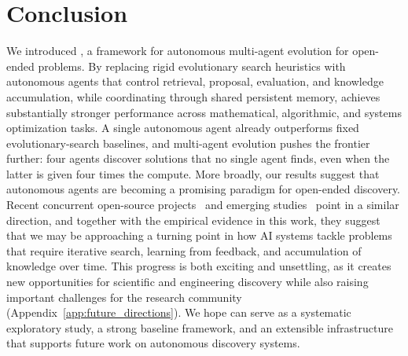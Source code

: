 
\section{Conclusion}

We introduced \method{}, a framework for autonomous multi-agent evolution for open-ended problems. By replacing rigid evolutionary search heuristics with autonomous agents that control retrieval, proposal, evaluation, and knowledge accumulation, while coordinating through shared persistent memory, \method{} achieves substantially stronger performance across mathematical, algorithmic, and systems optimization tasks. A single autonomous agent already outperforms fixed evolutionary-search baselines, and multi-agent evolution pushes the frontier further: four agents discover solutions that no single agent finds, even when the latter is given four times the compute. More broadly, our results suggest that autonomous agents are becoming a promising paradigm for open-ended discovery. Recent concurrent open-source projects~\citep{karpathy2026autoresearch,liu2026autoevolver,rllmorg2026hive} and emerging studies~\citep{chen2026avoagenticvariationoperators} point in a similar direction, and together with the empirical evidence in this work, they suggest that we may be approaching a turning point in how AI systems tackle problems that require iterative search, learning from feedback, and accumulation of knowledge over time. This progress is both exciting and unsettling, as it creates new opportunities for scientific and engineering discovery while also raising important challenges for the research community (Appendix~\ref{app:future_directions}). We hope \method{} can serve as a systematic exploratory study, a strong baseline framework, and an extensible infrastructure that supports future work on autonomous discovery systems.



